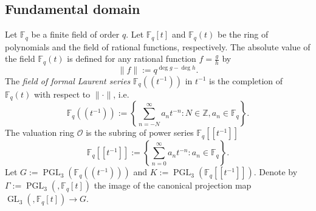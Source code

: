 \documentclass[11pt]{amsart}
\theoremstyle{definition}
\theoremstyle{remark}
\numberwithin{equation}{section}
\newcommand{\PGL}{\operatorname{PGL}}
\begin{document}
\subsection{Fundamental domain} Let $\mathbb{F}_q$ be a finite field of order $q$. Let $\mathbb{F}_q[t]$ and $\mathbb{F}_q(t)$ be the ring of polynomials and the field of rational functions, respectively. The absolute value of the field $\mathbb{F}_q(t)$ is defined for any rational function $f=\frac{g}{h}$ by
$$\|f\|:=q^{\deg{g}-\deg{h}}.$$
The \textit{field of formal Laurent series} $\mathbb{F}_q(\!(t^{-1})\!)$ in $t^{-1}$ is the completion of $\mathbb{F}_q(t)$ with respect to $\|\cdot\|$, i.e.
$$\mathbb{F}_q(\!(t^{-1})\!):=\left\{\sum_{n=-N}^\infty a_nt^{-n}:N\in \mathbb{Z},a_n\in \mathbb{F}_q\right\}.$$
The valuation ring $\mathcal{O}$ is the subring of power series $\mathbb{F}_q[\![t^{-1}]\!]$
$$\mathbb{F}_q[\![t^{-1}]\!]:=\left\{\sum_{n=0}^\infty a_nt^{-n}:a_n\in \mathbb{F}_q\right\}.$$
Let $G:=\PGL_3(\mathbb{F}_q(\!(t^{-1})\!))$ and $K:=\PGL_3(\mathbb{F}_q[\![t^{-1}]\!])$. Denote by $\Gamma:=\operatorname{PGL}_3(,\mathbb{F}_q[t])$ the image of the canonical projection map $\operatorname{GL}_3(,\mathbb{F}_q[t])\rightarrow G.$
\end{document}
